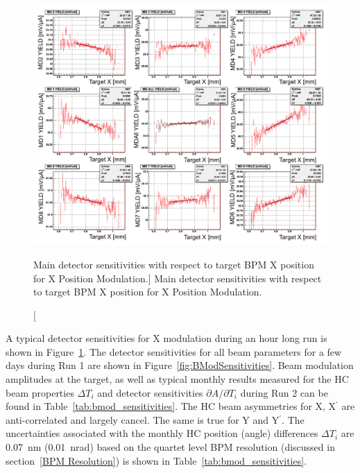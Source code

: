 \begin{singlespace}
\begin{figure}[!h]
	\begin{center}
	\includegraphics[width=15.0cm]{figures/BModDetectorSensitivity}
	\end{center}
	\caption
	[Main detector sensitivities with respect to target BPM X position for X Position Modulation.]	
	{Main detector sensitivities with respect to target BPM X position for X Position Modulation.}
	\label{fig:BModDetectorSensitivity}
\end{figure}
\end{singlespace}

A typical detector sensitivities for X modulation during an hour long run is shown in Figure~\ref{fig:BModDetectorSensitivity}. The detector sensitivities for all beam parameters for a few days during Run 1 are shown in Figure~\ref{fig:BModSensitivities}. 
Beam modulation amplitudes at the target, as well as typical monthly results measured for the HC beam properties $\Delta T_{i}$ and detector sensitivities $\partial A /\partial T_{i}$ during Run 2 can be found in Table~\ref{tab:bmod_sensitivities}. The HC beam asymmetries for X, X$^\prime$ are anti-correlated and largely cancel. The same is true for Y and Y$^\prime$. The uncertainties associated with the monthly HC position (angle) differences $\Delta T_{i}$ are 0.07~nm (0.01~nrad) based on the quartet level BPM resolution (discussed in section~\ref{BPM Resolution}) is shown in Table~\ref{tab:bmod_sensitivities}. 

